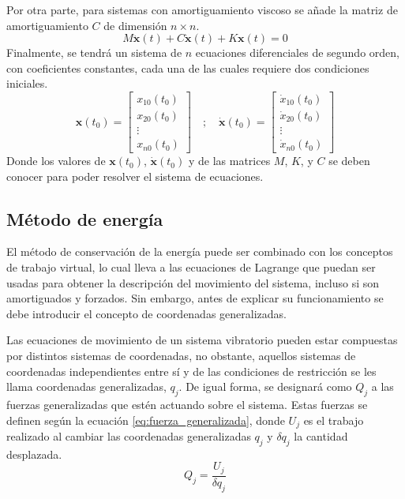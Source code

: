 \newpage

Por otra parte, para sistemas con amortiguamiento viscoso se añade la matriz de amortiguamiento $\mathit{C}$ de dimensión $n \times n$. 
\begin{equation}\label{eq:multi_degreedamp}
	\mathit{M}\mathbf{\ddot{x}}(t) + \mathit{C}\mathbf{\dot{x}}(t) + \mathit{K}\mathbf{x}(t) = 0	
\end{equation}
Finalmente, se tendrá un sistema de $n$ ecuaciones diferenciales de segundo orden, con coeficientes constantes, cada una de las cuales requiere dos condiciones iniciales.
\begin{equation}
	\mathbf{x}(t_0) = \begin{bmatrix}
	x_{10}(t_0)\\
	x_{20}(t_0)\\
	\vdots\\
	x_{n0}(t_0)
	\end{bmatrix} \quad ; \quad \mathbf{\dot{x}}(t_0) = \begin{bmatrix}
	\dot{x}_{10}(t_0)\\
	\dot{x}_{20}(t_0)\\
	\vdots\\
	\dot{x}_{n0}(t_0)
	\end{bmatrix}
\end{equation}
Donde los valores de $\mathbf{x}(t_0)$, $\mathbf{\dot{x}}(t_0)$ y de las matrices $\mathit{M}$, $\mathit{K}$, y $\mathit{C}$ se deben conocer para poder resolver el sistema de ecuaciones. 

\subsection{Método de energía}
\label{sec:metodo_energia}
El método de conservación de la energía puede ser combinado con los conceptos de trabajo virtual, lo cual lleva a las ecuaciones de Lagrange que puedan ser usadas para obtener la descripción del movimiento del sistema, incluso si son amortiguados y forzados. Sin embargo, antes de explicar su funcionamiento se debe introducir el concepto de coordenadas generalizadas.

Las ecuaciones de movimiento de un sistema vibratorio pueden estar compuestas por distintos sistemas de coordenadas, no obstante, aquellos sistemas de coordenadas independientes entre sí y de las condiciones de restricción se les llama coordenadas generalizadas, $q_j$. De igual forma, se designará como $Q_j$ a las fuerzas generalizadas que estén actuando sobre el sistema. Estas fuerzas se definen según la ecuación \ref{eq:fuerza_generalizada}, donde $U_j$ es el trabajo realizado al cambiar las coordenadas generalizadas $q_j$ y $\delta q_j$ la cantidad desplazada. 
\begin{equation}\label{eq:fuerza_generalizada}
	Q_j = \frac{U_j}{\delta q_j}
\end{equation} 

